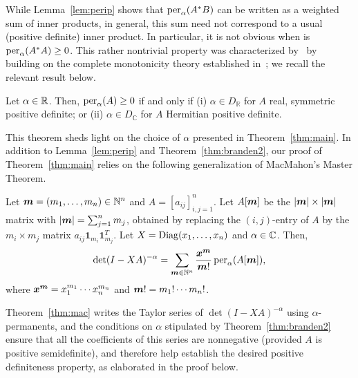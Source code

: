 \documentclass[11pt]{article}
\begin{document}
While Lemma~\ref{lem:perip} shows that $\operatorname{per}_\alpha(A^*B)$ can be written as a weighted sum of inner products, in general, this sum need not correspond to a usual (positive definite) inner product. In particular, it is not obvious when is $\operatorname{per}_\alpha(A^*A) \ge 0$. This rather nontrivial property was characterized by~\citep{branden2012} by building on the complete monotonicity theory established in~\citep{scott2014}; we recall the relevant result below.
\begin{theorem}
  \label{thm:branden2}
  Let $\alpha \in \mathbb{R}$. Then, $\operatorname{per}_\alpha(A) \ge 0$ if and only if (i) $\alpha \in D_{\mathbb{R}}$ for $A$ real, symmetric positive definite; or (ii) $\alpha \in D_{\mathbb{C}}$ for $A$ Hermitian positive definite.
\end{theorem}
\noindent This theorem sheds light on the choice of $\alpha$ presented in Theorem~\ref{thm:main}. In addition to Lemma~\ref{lem:perip} and Theorem~\ref{thm:branden2}, our proof of Theorem~\ref{thm:main} relies on the following generalization of MacMahon's Master Theorem.
\begin{theorem}
  \label{thm:mac}
  Let $\bm{m}=(m_1,\ldots,m_n) \in \mathbb{N}^n$ and $A=[a_{ij}]_{i,j=1}^n$. Let $A[\bm{m}]$ be the $|\bm{m}|\times |\bm{m}|$ matrix with $|\bm{m}|=\sum\nolimits_{j=1}^n m_j$, obtained by replacing the $(i,j)$-entry of $A$ by the $m_i\times m_j$ matrix $a_{ij}\bm{1}_{m_i}\bm{1}^T_{m_j}$. Let $X=\operatorname{Diag}(x_1,\ldots,x_n)$ and $\alpha \in \mathbb{C}$. Then,
  \begin{equation}
    \label{eq:3}
    \det(I - XA)^{-\alpha} = \sum_{\bm{m} \in \mathbb{N}^n}\frac{\bm{x}^{\bm{m}}}{\bm{m}!}\operatorname{per}_\alpha(A[\bm{m}]),
  \end{equation}
  where $\bm{x}^{\bm{m}}=x_1^{m_1}\cdots x_n^{m_n}$ and $\bm{m}!=m_1!\cdots m_n!$.
\end{theorem}
Theorem~\ref{thm:mac} writes the Taylor series of $\det(I-XA)^{-\alpha}$ using $\alpha$-permanents, and the conditions on $\alpha$ stipulated by Theorem~\ref{thm:branden2} ensure that all the coefficients of this series are nonnegative (provided $A$ is positive semidefinite), and therefore help establish the desired positive definiteness property, as elaborated in the proof below.
\end{document}
